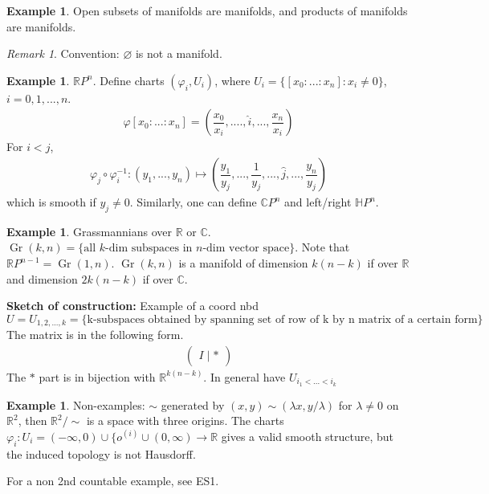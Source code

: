 \documentclass{article}
\theoremstyle{definition}
\newtheorem{example}[defn]{Example}
\theoremstyle{remark}
\newtheorem{rem}{Remark}
\theoremstyle{plain}
\newcommand{\RR}{\mathbb{R}}
\newcommand{\CC}{\mathbb{C}}
\newcommand{\HH}{\mathbb{H}}
\begin{document}
\begin{example}
    Open subsets of manifolds are manifolds, and products of manifolds are manifolds.
\end{example}
\begin{rem}
    Convention: $\varnothing$ is not a manifold.
\end{rem}
\begin{example}
    $\RR P^n$. Define charts $(\varphi_i, U_i)$, where $U_i=\{[x_0:...:x_n]:x_i\neq 0\}$, $i=0,1,...,n$. 
    \begin{align*}
        \varphi[x_0:...:x_n]=\left(\dfrac{x_0}{x_i},....,\hat{i},...,\dfrac{x_n}{x_i}\right)
    \end{align*}
    For $i<j$, 
    \begin{align*}
        \varphi_j\circ\varphi_i^{-1}:(y_1,...,y_n)\mapsto\left(\dfrac{y_1}{y_j},...,\dfrac{1}{y_j},...,\hat{j},...,\dfrac{y_n}{y_j}\right)
    \end{align*}
    which is smooth if $y_j\neq 0$. Similarly, one can define $\CC P^n$ and left/right $\HH P^n$.
\end{example}
\begin{example}
    Grassmannians over $\RR$ or $\CC$. $\operatorname{Gr}(k,n)=\{\text{all }k\text{-dim subspaces in }n\text{-dim vector space}\}$. Note that $\RR P^{n-1}=\operatorname{Gr}(1,n)$. $\operatorname{Gr}(k,n)$ is a manifold of dimension $k(n-k)$ if over $\RR$ and dimension $2k(n-k)$ if over $\CC$.

    \textbf{Sketch of construction:} Example of a coord nbd $U=U_{1,2,...,k}=\{\text{k-subspaces obtained by spanning set of row of k by n matrix of a certain form}\}$ The matrix is in the following form.
    \begin{align*}
        \begin{pmatrix}
        I\mid \ast
        \end{pmatrix}
    \end{align*}
    The $\ast$ part is in bijection with $\RR^{k(n-k)}$. In general have $U_{i_1<...<i_k}$
\end{example}
\begin{example}
    Non-examples: $\sim$ generated by $(x,y)\sim(\lambda x,y/\lambda)$ for $\lambda\neq 0$ on $\RR^2$, then $\RR^2/\sim$ is a space with three origins. The charts $\varphi_i:U_i=(-\infty,0)\cup\{o^{(i)}\cup(0,\infty)\to\RR$ gives a valid smooth structure, but the induced topology is not Hausdorff.

    For a non 2nd countable example, see ES1.
\end{example}
\end{document}
